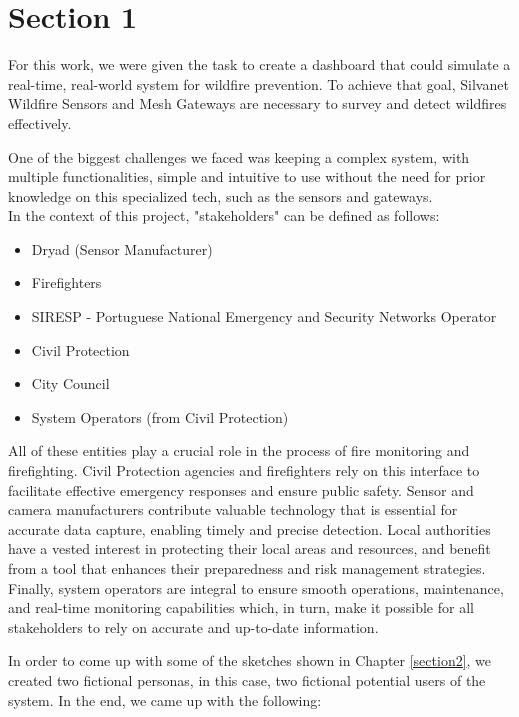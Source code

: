 \chapter{Section 1} \label{section1}
For this work, we were given the task to create a dashboard 
that could simulate a real-time, real-world system for wildfire 
prevention. To achieve
that goal, Silvanet Wildfire Sensors and Mesh Gateways are necessary to
survey and detect wildfires effectively. \par 
One of the biggest challenges we faced was keeping a complex system, with multiple functionalities, simple
and intuitive to use without the need for prior knowledge on this
specialized tech, such as the sensors and gateways. \\
In the context of this project, "stakeholders" can be defined as follows:
\begin{itemize}
    \item Dryad (Sensor Manufacturer)
    \item Firefighters
    \item SIRESP - Portuguese National Emergency 
    and Security Networks Operator 
    \item Civil Protection
    \item City Council
    \item System Operators (from Civil Protection)
\end{itemize} \par 
All of these entities play a crucial role in the process of fire monitoring and firefighting. 
Civil Protection agencies and firefighters rely on this 
interface to facilitate effective emergency responses and 
ensure public safety. Sensor and camera manufacturers contribute 
valuable technology that is essential for accurate data capture, 
enabling timely and precise detection. Local authorities have 
a vested interest in protecting their local areas and resources, 
and benefit from a tool that enhances their preparedness and 
risk management strategies. Finally, system operators are integral 
to ensure smooth operations, maintenance, and real-time monitoring 
capabilities which, in turn, make it possible for all stakeholders 
to rely on accurate and up-to-date information. \par
In order to come up with some of the sketches shown in Chapter \ref{section2},
we created two fictional personas, in this case, two 
fictional potential users of the system. In the end, we came up 
with the following:
 \\


